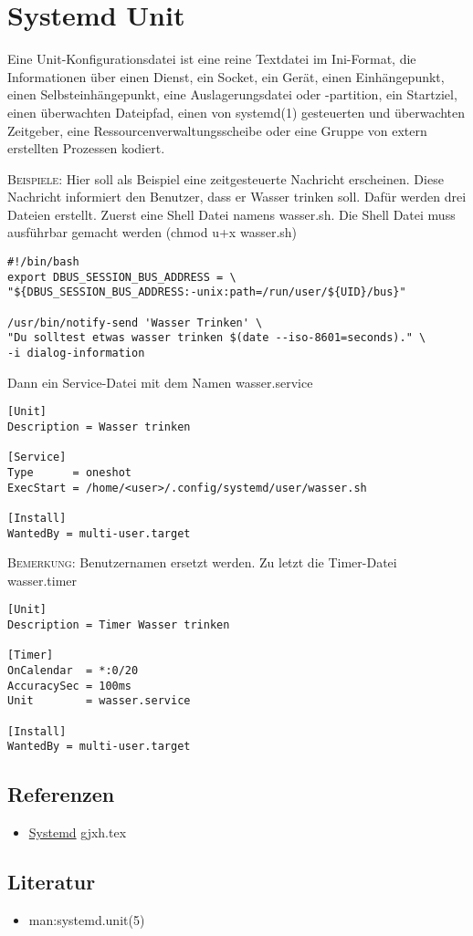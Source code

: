 \documentclass{sajzk}
\begin{document}
\section{Systemd Unit}
\label{okzh}

Eine Unit-Konfigurationsdatei ist eine reine Textdatei im Ini-Format, die
Informationen über einen Dienst, ein Socket, ein Gerät, einen Einhängepunkt,
einen Selbsteinhängepunkt, eine Auslagerungsdatei oder -partition, ein
Startziel, einen überwachten Dateipfad, einen von systemd(1) gesteuerten und
überwachten Zeitgeber, eine Ressourcenverwaltungsscheibe oder eine Gruppe von
extern erstellten Prozessen kodiert.

\textsc{Beispiele:}
Hier soll als Beispiel eine zeitgesteuerte Nachricht erscheinen. Diese
Nachricht informiert den Benutzer, dass er Wasser trinken soll. Dafür werden
drei Dateien erstellt. Zuerst eine Shell Datei namens wasser.sh. Die Shell
Datei muss ausführbar gemacht werden (chmod u+x wasser.sh)

\begin{verbatim}
#!/bin/bash
export DBUS_SESSION_BUS_ADDRESS = \
"${DBUS_SESSION_BUS_ADDRESS:-unix:path=/run/user/${UID}/bus}"

/usr/bin/notify-send 'Wasser Trinken' \
"Du solltest etwas wasser trinken $(date --iso-8601=seconds)." \
-i dialog-information
\end{verbatim}
\newpage
Dann ein Service-Datei mit dem Namen wasser.service
\begin{verbatim}
[Unit]
Description = Wasser trinken

[Service]
Type      = oneshot
ExecStart = /home/<user>/.config/systemd/user/wasser.sh

[Install]
WantedBy = multi-user.target
\end{verbatim}
\textsc{Bemerkung:} %
Benutzernamen ersetzt werden.
\newpage
Zu letzt die Timer-Datei wasser.timer
\begin{verbatim}
[Unit]
Description = Timer Wasser trinken

[Timer]
OnCalendar  = *:0/20
AccuracySec = 100ms
Unit        = wasser.service

[Install]
WantedBy = multi-user.target
\end{verbatim}

\subsection{Referenzen}
\begin{itemize}
    \item \href{gjxh.pdf}{Systemd} gjxh.tex
\end{itemize}

\subsection{Literatur}
\begin{itemize}
    \item man:systemd.unit(5)
\end{itemize}
\end{document}
